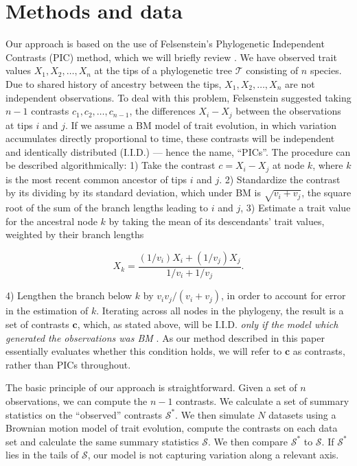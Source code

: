 \documentclass[12pt]{article}
\begin{document}
\section*{Methods and data}

Our approach is based on the use of Felsenstein's \citep{Felsenstein1973, Felsenstein1985} Phylogenetic Independent Contrasts (PIC) method, which we will briefly review \citep[for more details, see][]{Felsenstein1985, Rohlf2001, Blomberg2012}. We have observed trait values $X_1, X_2, \ldots, X_n$ at the tips of a phylogenetic tree $\mathcal{T}$ consisting of $n$ species. Due to shared history of ancestry between the tips, $X_1, X_2, \ldots, X_n$ are not independent observations. To deal with this problem, Felsenstein suggested taking $n-1$ contrasts $c_1, c_2, \ldots, c_{n-1}$, the differences $X_{i} - X_{j}$ between the observations at tips $i$ and $j$. If we assume a BM model of trait evolution, in which variation accumulates directly proportional to time, these contrasts will be independent and identically distributed (I.I.D.) --- hence the name, ``PICs''. The procedure can be described algorithmically: 1) Take the contrast $c = X_i - X_j$ at node $k$, where $k$ is the most recent common ancestor of tips $i$ and $j$. 2) Standardize the contrast by its dividing by its standard deviation, which under BM is $\sqrt{v_i + v_j}$, the square root of the sum of the branch lengths leading to $i$ and $j$, 3) Estimate a trait value for the ancestral node $k$ by taking the mean of its descendants' trait values, weighted by their branch lengths

\begin{equation}
X_k = \frac{(1 / v_i)X_i + (1 / v_j)X_j}{1/v_i + 1/v_j}.
\end{equation}

4) Lengthen the branch below $k$ by $v_i v_j / (v_i + v_j)$, in order to account for error in the estimation of $k$. Iterating across all nodes in the phylogeny, the result is a set of contrasts $\mathbf{c}$, which, as stated above, will be I.I.D. \textit{only if the model which generated the observations was BM} \citep{Rohlf2001}. As our method described in this paper essentially evaluates whether this condition holds, we will refer to $\mathbf{c}$ as contrasts, rather than PICs throughout.

The basic principle of our approach is straightforward. Given a set of $n$ observations, we can compute the $n-1$ contrasts. We calculate a set of summary statistics on the ``observed'' contrasts $\mathcal{S}^*$. We then simulate $N$ datasets using a Brownian motion model of trait evolution, compute the contrasts on each data set and calculate the same summary statistics $\mathcal{S}$. We then compare $\mathcal{S}^*$ to $\mathcal{S}$. If $\mathcal{S}^*$ lies in the tails of $\mathcal{S}$, our model is not capturing variation along a relevant axis.
\end{document}
